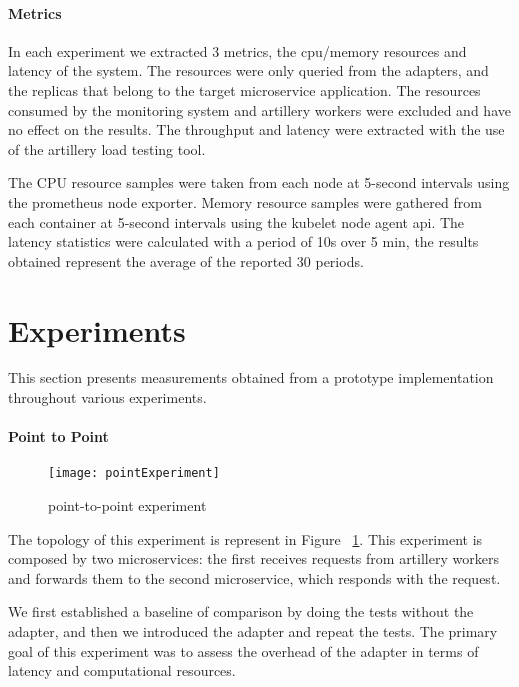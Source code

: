 \paragraph{Metrics}

In each experiment we extracted 3 metrics, the cpu/memory resources and latency of the system.
The resources were only queried from the adapters, and the replicas that belong to the target microservice application.
The resources consumed by the monitoring system and artillery workers were excluded and have no effect
on the results.
The throughput and latency were extracted with the use of the artillery load testing tool.

The CPU resource samples were taken from each node at 5-second intervals using the prometheus node exporter.
Memory resource samples were gathered from each container at 5-second intervals using the kubelet node agent api.
The latency statistics were calculated with a period of 10s over 5 min, the results obtained represent the
average of the reported 30 periods.

\section{Experiments} %
\label{sec:experiments}

This section presents measurements obtained from a prototype implementation throughout various experiments.


\paragraph{Point to Point}

\begin{figure}[htbp]
    \centering
    \texttt{[image: pointExperiment]}
    \caption{point-to-point experiment}
    \label{fig:point}
\end{figure}

The topology of this experiment is represent in Figure ~\ref{fig:point}.
This experiment is composed by two microservices:
the first receives requests from artillery workers and forwards them to the second microservice, which responds with the request.

We first established a baseline of comparison
by doing the tests without the adapter, and then we introduced the adapter and repeat the tests.
The primary goal of this experiment was to assess the overhead of the adapter in terms of latency and computational resources.

